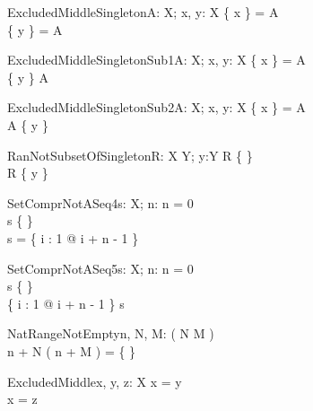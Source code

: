 \begin{theorem}{ExcludedMiddleSingleton}{A: \power X; \const x, \const y: X}
\{ x \} = A \\
\{ y \} = A
\end{theorem}

\begin{theorem}{ExcludedMiddleSingletonSub1}{A: \power X; \const x, \const y: X}
\{ x \} = A \\
\{ y \} \subset A
\end{theorem}

\begin{theorem}{ExcludedMiddleSingletonSub2}{A: \power X; \const x, \const y: X}
\{ x \} = A \\
A  \subset \{ y \}
\end{theorem}

\begin{theorem}{RanNotSubsetOfSingleton}{R: X \rel Y; y:Y}
R \neq \{ \} \\
\ran R \subset \{ y \} 
\end{theorem}




\begin{theorem}{SetComprNotASeq4}{s: \seq X; n: \nat}
n = 0 \\
s \neq \{ \} \\
\dom s = \dom \{ i : 1 \upto \anything @ i + n - 1 \mapsto \anything \}
\end{theorem}

\begin{theorem}{SetComprNotASeq5}{s: \seq X; n: \nat}
n = 0 \\
s \neq \{ \} \\
\dom \{ i : 1 \upto \anything @ i + n - 1 \mapsto \anything \} \subset \dom s
\end{theorem}

\begin{theorem}{NatRangeNotEmpty}{n, \const N, \const M: \nat}
\eval( N \leq M ) \\
n + N \upto ( n + M ) = \{ \}
\end{theorem}

\begin{theorem}{ExcludedMiddle}{x, \const y, \const z: X}
x = y \\
x = z
\end{theorem}


